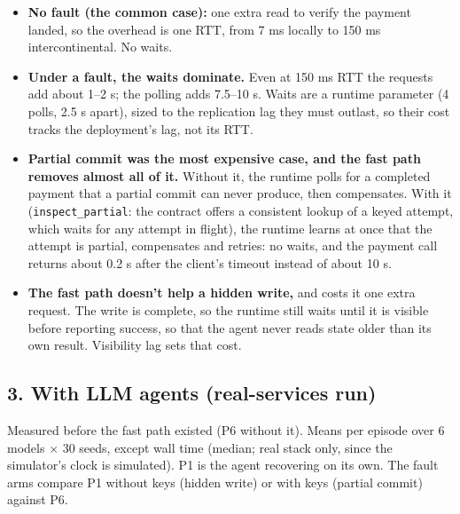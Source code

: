 \documentclass[letterpaper,twocolumn,10pt]{article}
\begin{document}
\begin{itemize}
\item \textbf{No fault (the common case):} one extra read to verify the payment landed, so the overhead is one RTT, from 7 ms locally to 150 ms intercontinental. No waits.
\item \textbf{Under a fault, the waits dominate.} Even at 150 ms RTT the requests add about 1--2 s; the polling adds 7.5--10 s. Waits are a runtime parameter (4 polls, 2.5 s apart), sized to the replication lag they must outlast, so their cost tracks the deployment's lag, not its RTT.
\item \textbf{Partial commit was the most expensive case, and the fast path removes almost all of it.} Without it, the runtime polls for a completed payment that a partial commit can never produce, then compensates. With it (\texttt{inspect\_partial}: the contract offers a consistent lookup of a keyed attempt, which waits for any attempt in flight), the runtime learns at once that the attempt is partial, compensates and retries: no waits, and the payment call returns about 0.2 s after the client's timeout instead of about 10 s.
\item \textbf{The fast path doesn't help a hidden write,} and costs it one extra request. The write is complete, so the runtime still waits until it is visible before reporting success, so that the agent never reads state older than its own result. Visibility lag sets that cost.
\end{itemize}

\subsection*{3. With LLM agents (real-services run)}

Measured before the fast path existed (P6 without it). Means per episode over 6 models $\times$ 30 seeds, except wall time (median; real stack only, since the simulator's clock is simulated). P1 is the agent recovering on its own. The fault arms compare P1 without keys (hidden write) or with keys (partial commit) against P6.
\end{document}
